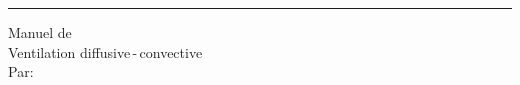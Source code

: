 \begin{titlepage}
	\makeatletter
	\raggedright
	\parbox[b][\textheight][t]{.19\textwidth}{%
		\vspace{2\baselineskip}
		\logofvc{3cm}
		\vfill
	}
	\rule{1pt}{\textheight}
	\hspace{.04\textwidth}
	\parbox[b][\textheight][t]{.62\textwidth}{%
		\raggedright
		\vfill
		Manuel de\\
		{\huge Ventilation diffusive\,-\,convective\\[2\baselineskip]}
		Par:\\[0.75\baselineskip]
		\@author\vfill
		\@date\\[1.5\baselineskip]
	}
	\makeatother
\end{titlepage}
